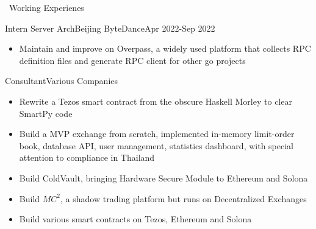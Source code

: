 \documentclass{resume}
\begin{document}
\begin{rSection}{\faUsers~Working Experienes}
\begin{rExperience}{Intern Server Arch}{Beijing ByteDance}{Apr 2022-Sep 2022}
\begin{itemize}
            \item Maintain and improve on Overpass, a widely used platform that collects RPC definition files and generate RPC client for other go projects
        \end{itemize}
    \end{rExperience}
    \begin{rExperience}{Consultant}{Various Companies}{~}
        \begin{itemize}
            \itemsep -0.5em \vspace{-0.5em}
            \item Rewrite a Tezos smart contract from the obscure Haskell Morley to clear SmartPy code
            \item Build a MVP exchange from scratch, implemented in-memory limit-order book, database API, user management, statistics dashboard, with special attention to compliance in Thailand
            \item Build ColdVault, bringing Hardware Secure Module to Ethereum and Solona
            \item Build $MC^{2}$, a shadow trading platform but runs on Decentralized Exchanges
            \item Build various smart contracts on Tezos, Ethereum and Solona
        \end{itemize}
    \end{rExperience}
    

\end{rSection}
\end{document}

